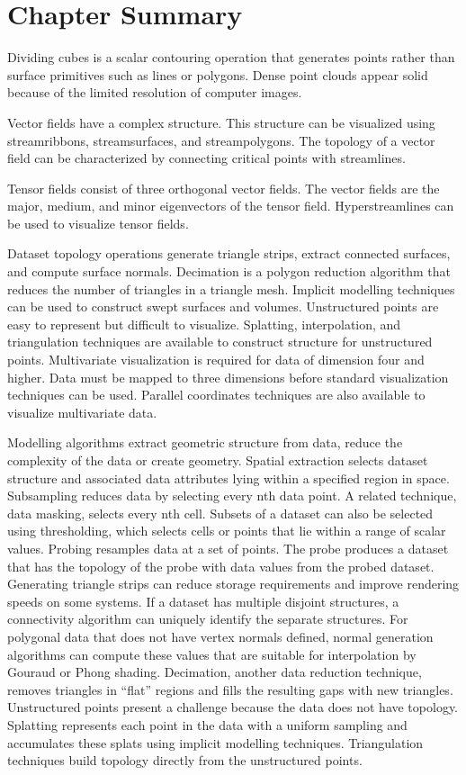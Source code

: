 \section{Chapter Summary}

Dividing cubes is a scalar contouring operation that generates points rather than surface primitives such as lines or polygons. Dense point clouds appear solid because of the limited resolution of computer images.

Vector fields have a complex structure. This structure can be visualized using streamribbons, streamsurfaces, and streampolygons. The topology of a vector field can be characterized by connecting critical points with streamlines.

Tensor fields consist of three orthogonal vector fields. The vector fields are the major, medium, and minor eigenvectors of the tensor field. Hyperstreamlines can be used to visualize tensor fields.

Dataset topology operations generate triangle strips, extract connected surfaces, and compute surface normals. Decimation is a polygon reduction algorithm that reduces the number of triangles in a triangle mesh. Implicit modelling techniques can be used to construct swept surfaces and volumes. Unstructured points are easy to represent but difficult to visualize. Splatting, interpolation, and triangulation techniques are available to construct structure for unstructured points. Multivariate visualization is required for data of dimension four and higher. Data must be mapped to three dimensions before standard visualization techniques can be used. Parallel coordinates techniques are also available to visualize multivariate data.

Modelling algorithms extract geometric structure from data, reduce the complexity of the data or create geometry. Spatial extraction selects dataset structure and associated data attributes lying within a specified region in space. Subsampling reduces data by selecting every nth data point. A related technique, data masking, selects every nth cell. Subsets of a dataset can also be selected using thresholding, which selects cells or points that lie within a range of scalar values. Probing resamples data at a set of points. The probe produces a dataset that has the topology of the probe with data values from the probed dataset. Generating triangle strips can reduce storage requirements and improve rendering speeds on some systems. If a dataset has multiple disjoint structures, a connectivity algorithm can uniquely identify the separate structures. For polygonal data that does not have vertex normals defined, normal generation algorithms can compute these values that are suitable for interpolation by Gouraud or Phong shading. Decimation, another data reduction technique, removes triangles in ``flat'' regions and fills the resulting gaps with new triangles. Unstructured points present a challenge because the data does not have topology. Splatting represents each point in the data with a uniform sampling and accumulates these splats using implicit modelling techniques. Triangulation techniques build topology directly from the unstructured points.


